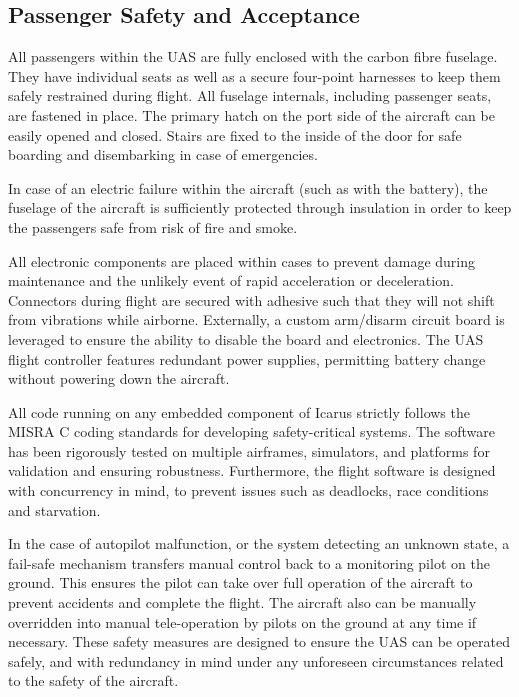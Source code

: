 \clearpage

\subsection{Passenger Safety and Acceptance}
\label{sec:safety}

All passengers within the UAS are fully enclosed with the carbon fibre
fuselage. They have individual seats as well as a secure four-point harnesses
to keep them safely restrained during flight. All fuselage internals, including
passenger seats, are fastened in place. The primary hatch on the port side of
the aircraft can be easily opened and closed. Stairs are fixed to the inside of
the door for safe boarding and disembarking in case of emergencies.

In case of an electric failure within the aircraft (such as with the battery),
the fuselage of the aircraft is sufficiently protected through insulation in
order to keep the passengers safe from risk of fire and smoke.

All electronic components are placed within cases to prevent damage during
maintenance and the unlikely event of rapid acceleration or deceleration.
Connectors during flight are secured with adhesive such that they will not
shift from vibrations while airborne. Externally, a custom arm/disarm circuit
board is leveraged to ensure the ability to disable the board and electronics.
The UAS flight controller features redundant power supplies, permitting
battery change without powering down the aircraft.

All code running on any embedded component of Icarus strictly follows the MISRA
C coding standards for developing safety-critical systems. The software has
been rigorously tested on multiple airframes, simulators, and platforms for
validation and ensuring robustness. Furthermore, the flight software is
designed with concurrency in mind, to prevent issues such as deadlocks, race
conditions and starvation.

In the case of autopilot malfunction, or the system detecting an unknown state,
a fail-safe mechanism transfers manual control back to a monitoring pilot on
the ground. This ensures the pilot can take over full operation of the aircraft
to prevent accidents and complete the flight. The aircraft also can be manually
overridden into manual tele-operation by pilots on the ground at any time if
necessary. These safety measures are designed to ensure the UAS can be operated
safely, and with redundancy in mind under any unforeseen circumstances related
to the safety of the aircraft.
